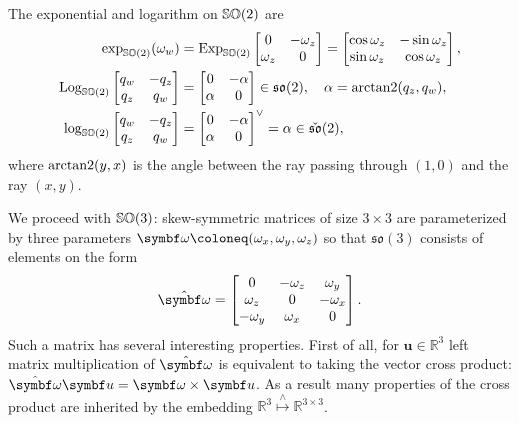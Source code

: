 \begin{important}
  The exponential and logarithm on ${\mathbb{SO}(2)}$ are
  \begin{subequations}
    \begin{align}
      \exp_{\mathbb{SO}(2)} (\omega_w)                 & = \operatorname{Exp}_{\mathbb{SO}(2)} \begin{bmatrix} 0 & -\omega_z \\ \omega_z & 0 \end{bmatrix}= \begin{bmatrix} \cos \omega_z & - \sin \omega_z \\ \sin \omega_z & \cos \omega_z \end{bmatrix},                   \\
      \operatorname{Log}_{\mathbb{SO}(2)} \begin{bmatrix}
        q_w & -q_z \\ q_z & q_w
      \end{bmatrix} & = \begin{bmatrix} 0 & -\alpha \\ \alpha & 0 \end{bmatrix} \in \mathfrak{so}(2), \quad \alpha = \operatorname{arctan2}(q_z, q_w), \\
      \log_{\mathbb{SO}(2)} \begin{bmatrix}
        q_w & -q_z \\ q_z & q_w
      \end{bmatrix} & = \begin{bmatrix} 0 & -\alpha \\ \alpha & 0 \end{bmatrix}^{\vee} = \alpha \in \check{\mathfrak{so}}(2),
    \end{align}
  \end{subequations}
  where $\operatorname{arctan2}(y, x)$ is the angle between the ray passing through $(1, 0)$ and the ray $(x, y)$.
\end{important}

We proceed with ${\mathbb{SO}(3)}$: skew-symmetric matrices of size $3 \times 3$ are parameterized by three parameters $\bomega  \coloneq (\omega_x, \omega_y, \omega_z)$ so that $\mathfrak{so}(3)$ consists of elements on the form
\begin{equation}
  \hat {\bomega} = \begin{bmatrix} 0 & -\omega_z & \omega_y \\ \omega_z & 0 & -\omega_x \\ -\omega_y & \omega_x & 0	\end{bmatrix}.
\end{equation}
Such a matrix has several interesting properties. First of all, for $\symbf u \in \mathbb{R}^3$ left matrix multiplication of $\hat {\bomega}$ is equivalent to taking the vector cross product: $\hat {\bomega} \symbf u = \bomega \times \symbf u$.
As a result many properties of the cross product are inherited by the embedding $\mathbb{R}^3 \overset{\wedge}\mapsto \mathbb{R}^{3 \times 3}$.

